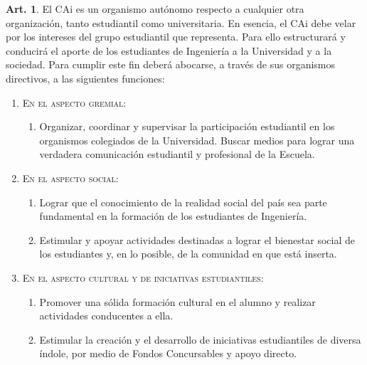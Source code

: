 \documentclass[letterpaper,11pt]{article}
\theoremstyle{definition}%
\newtheorem{art}{Art.} %
\begin{document}
\begin{art}\label{finalidadesCAi}
	El CAi es un organismo autónomo respecto a cualquier otra organización, tanto estudiantil como universitaria. En esencia, el CAi debe velar por los intereses del grupo estudiantil que representa. Para ello estructurará y conducirá el aporte de los estudiantes de Ingeniería a la Universidad y a la sociedad. Para cumplir este fin deberá abocarse, a través de sus organismos directivos, a las siguientes funciones:

	\begin{enumerate}

		\item \label{gremial}\textsc{En el aspecto gremial:}
		      \begin{enumerate}
			      \item Organizar, coordinar y supervisar la participación estudiantil en los organismos colegiados de la Universidad. Buscar medios para lograr una verdadera comunicación estudiantil y profesional de la Escuela.
		      \end{enumerate}

		\item \label{social} \textsc{En el aspecto social:}
		      \begin{enumerate}
			      \item Lograr que el conocimiento de la realidad social del país sea parte fundamental en la formación de los estudiantes de Ingeniería.

			      \item \label{bienestar_social} Estimular y apoyar actividades destinadas a lograr el bienestar social de los estudiantes y, en lo posible, de la comunidad en que está inserta.
		      \end{enumerate}

		\item \label{cultural}\textsc{En el aspecto cultural y de iniciativas estudiantiles:}
		      \begin{enumerate}
			      \item Promover una sólida formación cultural en el alumno y realizar actividades conducentes a ella.

			      \item Estimular la creación y el desarrollo de iniciativas estudiantiles de diversa índole, por medio de Fondos Concursables y apoyo directo.
		      \end{enumerate}

	\end{enumerate}
\end{art}
\end{document}
